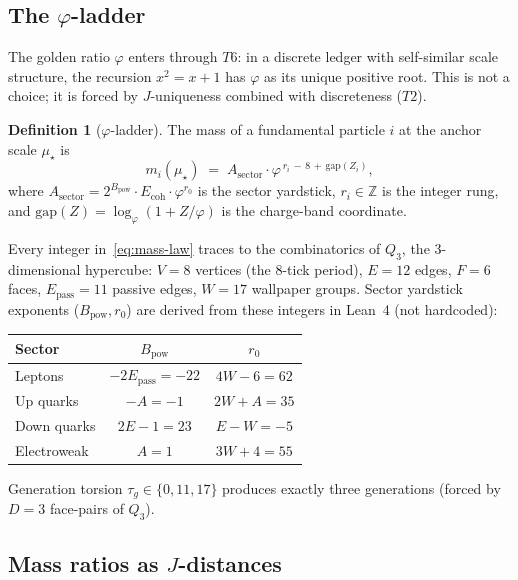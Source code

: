 \documentclass[11pt,a4paper]{article}
\theoremstyle{plain}
\theoremstyle{definition}
\newtheorem{definition}[theorem]{Definition}
\theoremstyle{remark}
\newcommand{\Z}{\mathbb{Z}}
\newcommand{\Jcost}{J}
\newcommand{\vp}{\varphi}
\begin{document}
\subsection{The $\vp$-ladder}

The golden ratio $\vp$ enters through $T6$: in a discrete ledger
with self-similar scale structure, the recursion $x^2 = x + 1$ has
$\vp$ as its unique positive root.  This is not a choice; it is
forced by $\Jcost$-uniqueness combined with discreteness ($T2$).

\begin{definition}[$\vp$-ladder]
The mass of a fundamental particle $i$ at the anchor scale $\mu_\star$ is
\begin{equation}
\label{eq:mass-law}
  m_i(\mu_\star) \;=\; A_{\text{sector}} \cdot
  \vp^{\,r_i \,-\, 8 \,+\, \text{gap}(Z_i)},
\end{equation}
where $A_{\text{sector}} = 2^{B_{\text{pow}}} \cdot E_{\text{coh}}
\cdot \vp^{r_0}$ is the sector yardstick, $r_i \in \Z$ is the integer
rung, and $\text{gap}(Z) = \log_\vp(1 + Z/\vp)$ is the
charge-band coordinate.
\end{definition}

Every integer in~\eqref{eq:mass-law} traces to the combinatorics of
$Q_3$, the 3-dimensional hypercube: $V = 8$ vertices (the 8-tick
period), $E = 12$ edges, $F = 6$ faces, $E_{\text{pass}} = 11$
passive edges, $W = 17$ wallpaper groups.  Sector yardstick
exponents ($B_{\text{pow}}, r_0$) are derived from these integers
in Lean~4 (not hardcoded):

\begin{center}
\renewcommand{\arraystretch}{1.2}
\begin{tabular}{@{}lcc@{}}
\toprule
\textbf{Sector} & $B_{\text{pow}}$ & $r_0$ \\
\midrule
Leptons    & $-2 E_{\text{pass}} = -22$ & $4W - 6 = 62$ \\
Up quarks  & $-A = -1$                  & $2W + A = 35$ \\
Down quarks& $2E - 1 = 23$              & $E - W = -5$  \\
Electroweak& $A = 1$                    & $3W + 4 = 55$ \\
\bottomrule
\end{tabular}
\end{center}

Generation torsion $\tau_g \in \{0, 11, 17\}$ produces exactly three
generations (forced by $D = 3$ face-pairs of $Q_3$).

\subsection{Mass ratios as $\Jcost$-distances}
\end{document}
